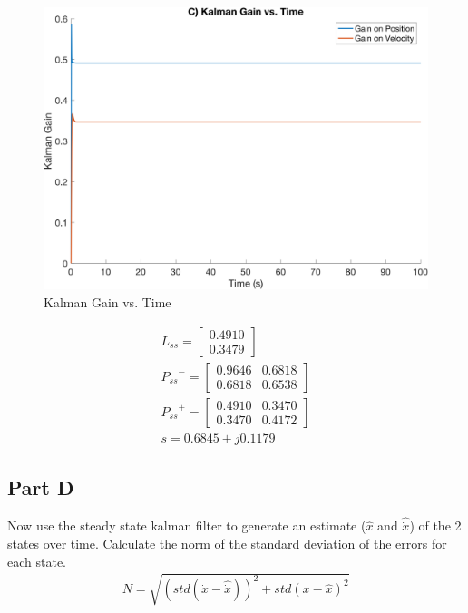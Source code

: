 \documentclass{article}
\begin{document}
\begin{figure}[H]
    \centering
    \includegraphics[width=0.75\linewidth]{../figures/p1c2.png}
    \caption{Kalman Gain vs. Time}\label{fig:p1c2}
\end{figure}

\begin{gather*}
    L_{ss} = \begin{bmatrix}
        0.4910\\
        0.3479
    \end{bmatrix}\\
    {P_{ss}}^{-} = \begin{bmatrix}
        0.9646 & 0.6818\\
        0.6818 & 0.6538
    \end{bmatrix}\\
    {P_{ss}}^{+} = \begin{bmatrix}
        0.4910 & 0.3470\\
        0.3470 & 0.4172
    \end{bmatrix}\\
    s = 0.6845 \pm j0.1179
\end{gather*}

\subsection*{Part D}
Now use the steady state kalman filter to generate an estimate ($\hat{x}$ and $\hat{\dot{x}}$) of the 2 states over time.  Calculate the norm of 
the standard deviation of the errors for each state.
\begin{gather}
    N = \sqrt{(std(\dot{x} - \hat{\dot{x}}))^2 + std(x - \hat{x})^2}
\end{gather}
\end{document}
